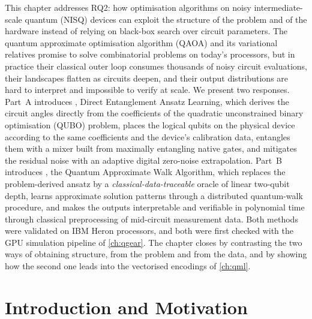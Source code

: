 This chapter addresses RQ2: how optimisation algorithms on noisy intermediate-scale quantum (NISQ) devices can exploit the structure of the problem and of the hardware instead of relying on black-box search over circuit parameters. The quantum approximate optimisation algorithm (QAOA) and its variational relatives promise to solve combinatorial problems on today's processors, but in practice their classical outer loop consumes thousands of noisy circuit evaluations, their landscapes flatten as circuits deepen, and their output distributions are hard to interpret and impossible to verify at scale. We present two responses. Part~A introduces \deal, Direct Entanglement Ansatz Learning, which derives the circuit angles directly from the coefficients of the quadratic unconstrained binary optimisation (QUBO) problem, places the logical qubits on the physical device according to the same coefficients and the device's calibration data, entangles them with a mixer built from maximally entangling native gates, and mitigates the residual noise with an adaptive digital zero-noise extrapolation. Part~B introduces \qawa, the Quantum Approximate Walk Algorithm, which replaces the problem-derived ansatz by a \emph{classical-data-traceable} oracle of linear two-qubit depth, learns approximate solution patterns through a distributed quantum-walk procedure, and makes the outputs interpretable and verifiable in polynomial time through classical preprocessing of mid-circuit measurement data. Both methods were validated on IBM Heron processors, and both were first checked with the GPU simulation pipeline of \cref{ch:qgear}. The chapter closes by contrasting the two ways of obtaining structure, from the problem and from the data, and by showing how the second one leads into the vectorised encodings of \cref{ch:qml}.

\section{Introduction and Motivation}\label{sec:nisq:intro}

